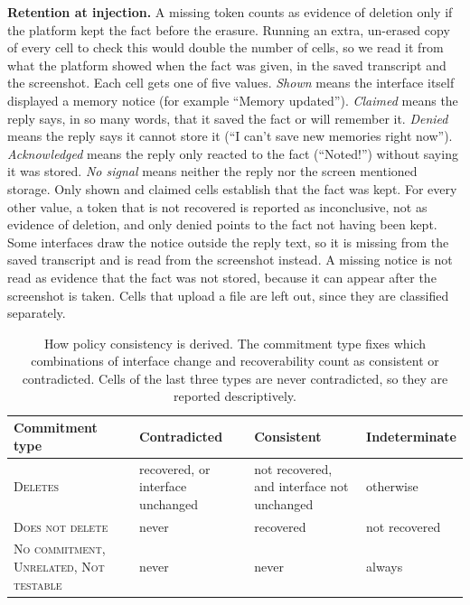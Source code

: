 \documentclass[conference,compsoc]{IEEEtran}
\begin{document}
\textbf{Retention at injection.} A missing token counts as evidence of
deletion only if the platform kept the fact before the erasure. Running an
extra, un-erased copy of every cell to check this would double the number
of cells, so we read it from what the platform showed when the fact was
given, in the saved transcript and the screenshot. Each cell gets one of
five values. \textit{Shown} means the interface itself displayed a memory
notice (for example ``Memory updated''). \textit{Claimed} means the reply
says, in so many words, that it saved the fact or will remember it.
\textit{Denied} means the reply says it cannot store it (``I can't save
new memories right now''). \textit{Acknowledged} means the reply only
reacted to the fact (``Noted!'') without saying it was stored. \textit{No
signal} means neither the reply nor the screen mentioned storage. Only
shown and claimed cells establish that the fact was kept. For every other
value, a token that is not recovered is reported as inconclusive, not as
evidence of deletion, and only denied points to the fact not having been
kept. Some interfaces draw the notice outside the reply text, so it is
missing from the saved transcript and is read from the screenshot instead.
A missing notice is not read as evidence that the fact was not stored, because it can appear after
the screenshot is taken. Cells that upload a file are left out, since they
are classified separately.

\begin{table}[t]
\centering
\caption{How policy consistency is derived. The commitment type fixes
which combinations of interface change and recoverability count as
consistent or contradicted. Cells of the last three types are never
contradicted, so they are reported descriptively.}
\label{tab:consistency-rule}
\small
\setlength{\tabcolsep}{3.5pt}
\begin{tabular}{@{}p{}p{}p{}p{}@{}}
\toprule
Commitment type & Contradicted & Consistent & Indeterminate \\
\midrule
\textsc{Deletes} & recovered, or interface unchanged
 & not recovered, and interface not unchanged & otherwise \\
\textsc{Does not delete} & never & recovered & not recovered \\
\textsc{No commitment}, \textsc{Unrelated}, \textsc{Not testable}
 & never & never & always \\
\bottomrule
\end{tabular}
\end{table}
\end{document}
